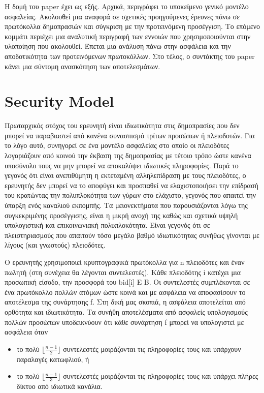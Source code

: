 \documentclass[a4paper,11pt]{article}
\begin{document}
Η δομή του paper έχει ως εξής. Αρχικά, περιγράφει το υποκείμενο γενικό μοντέλο ασφαλείας. Ακολουθεί μια αναφορά
σε σχετικές προηγούμενες έρευνες πάνω σε πρωτόκολλα δημοπρασιών και σύγκριση με την προτεινόμενη προσέγγιση. Το
επόμενο κομμάτι περιέχει μια αναλυτική περιγραφή των εννοιών που χρησιμοποιούνται στην υλοποίηση που ακολουθεί.
Έπεται μια ανάλυση πάνω στην ασφάλεια και την αποδοτικότητα των προτεινόμενων πρωτοκόλλων. Στο τέλος, ο
συντάκτης του paper κάνει μια σύντομη ανασκόπηση των αποτελεσμάτων.

\section{Security Model}

Πρωταρχικός στόχος του ερευνητή είναι ιδιωτικότητα στις δημοπρασίες που δεν μπορεί να παραβιαστεί από κανένα
συνασπισμό τρίτων προσώπων ή πλειοδοτών. Για το λόγο αυτό, συνηγορεί σε ένα μοντέλο ασφαλείας στο οποίο οι
πλειοδότες λογαριάζουν από κοινού την έκβαση της δημοπρασίας με τέτοιο τρόπο ώστε κανένα υποσύνολο τους να μην
μπορεί να αποκαλύψει ιδιωτικές πληροφορίες. Παρά το γεγονός ότι είναι ανεπιθύμητη η εκτεταμένη αλληλεπίδραση με
τους πλειοδότες, ο ερευνητής δεν μπορεί να το αποφύγει και προσπαθεί να ελαχιστοποιήσει την επίδρασή του
κρατώντας την πολυπλοκότητα των γύρων στο ελάχιστο, γεγονός που απαιτεί την ύπαρξη ενός καναλιού εκπομπής. Τα
μειονεκτήματα που παρουσιάζονται λόγω της συγκεκριμένης προσέγγισης, είναι η μικρή ανοχή της καθώς και σχετικά
υψηλή υπολογιστική και επικοινωνιακή πολυπλοκότητα. Είναι γεγονός ότι σε πλειστηριασμούς που απαιτούν τόσο
μεγάλο βαθμό ιδιωτικότητας συνήθως γίνονται με λίγους (και γνωστούς) πλειοδότες.

Ο ερευνητής χρησιμοποιεί κρυπτογραφικά πρωτόκολλα για n πλειοδότες και έναν πωλητή (στη συνέχεια θα λέγονται
συντελεστές). Κάθε πλειοδότης i κατέχει μια προσωπική είσοδο, την προσφορά του bid[i] E B. Οι συντελεστές
συμπλέκονται σε ένα πρωτόκολλο πολλών ατόμων ώστε κοινά και με ασφάλεια να αποφασίσουν το αποτέλεσμα της
συνάρτησης f. Στη δική μας σκοπιά, η ασφάλεια αποτελείται από ορθότητα και ιδιωτικότητα. Τα συνήθη
αποτελέσματα από ασφαλείς υπολογισμούς πολλών προσώπων υποδεικνύουν ότι κάθε συνάρτηση f μπορεί να υπολογιστεί
με ασφάλεια όταν
\begin{itemize}
	\item το πολύ $\lfloor \frac{n-1}{2} \rfloor$ συντελεστές μοιράζονται τις πληροφορίες τους και υπάρχουν παραλαγές κατωφλιού, ή 
	\item το πολύ $\lfloor \frac{n-1}{3} \rfloor$ συντελεστές μοιράζονται τις πληροφορίες τους και υπάρχει πλήρες δίκτυο από
ιδιωτικά κανάλια.
\end{itemize}
\end{document}
